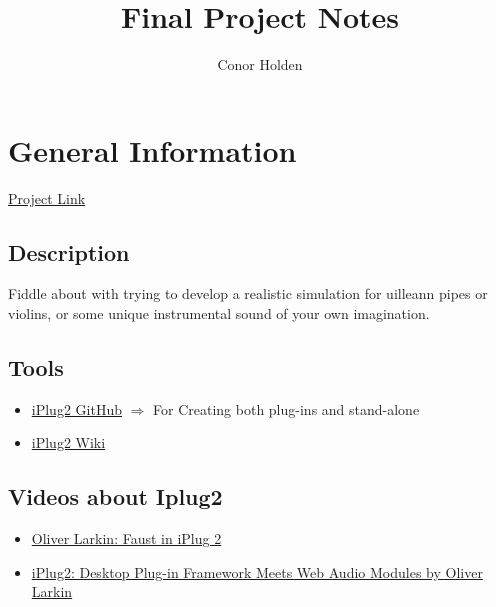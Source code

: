 \documentclass{article}
\title{Final Project Notes}
\author{Conor Holden }
\begin{document}
\maketitle

\tableofcontents

\section{General Information}

	\href{http://project.cs.ucc.ie/project/567}{Project Link}
	
	\subsection{Description}
		Fiddle about with trying to develop a realistic simulation for uilleann pipes or violins, 
		or some unique instrumental sound of your own imagination.
		
	\subsection{Tools}
		\begin{itemize}
			\item \href{https://github.com/iPlug2/iPlug2}{iPlug2 GitHub} $\Rightarrow$ For Creating both plug-ins and stand-alone
			\item \href{https://github.com/iPlug2/iPlug2/wiki}{iPlug2 Wiki}
		\end{itemize}
	
	\subsection{Videos about Iplug2 }
		\begin{itemize}
			\item \href{https://www.youtube.com/watch?v=SLHGxBYeID4\&feature=youtu.be}{Oliver Larkin: Faust in iPlug 2}
			\item \href{https://www.youtube.com/watch?v=DDrgW4Qyz8Y\&feature=youtu.be}{iPlug2: Desktop Plug-in Framework Meets Web Audio Modules by Oliver Larkin}
		\end{itemize}
	 


	
\end{document}
